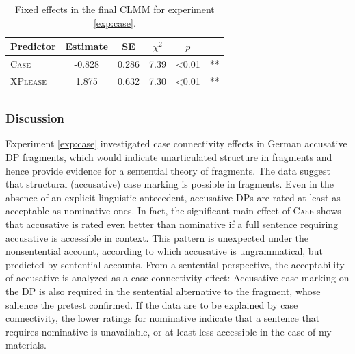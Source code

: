 \begin{table}
\begin{tabular}{lccccc}
\lsptoprule
Predictor & Estimate & SE & $\chi^2$ &  $p$ &  \\   
\midrule
\textsc{Case} & -0.828 &  0.286 &7.39 & \textless 0.01 & ** \\
\textsc{XPlease} &    \phantom{-}1.875 &     0.632 &   7.30 &  \textless 0.01 & **\\
\lspbottomrule
\end{tabular}
\caption{Fixed effects in the final CLMM for experiment \ref{exp:case}. \label{tab:case-estimates}}
\end{table}

\subsubsection{Discussion}\largerpage
Experiment \ref{exp:case} investigated case connectivity effects in German accusative DP fragments, which would indicate unarticulated structure in fragments and hence provide evidence for a sentential theory of fragments. The data suggest that structural (accusative) case marking is possible in fragments. Even in the absence of an explicit linguistic antecedent, accusative DPs are rated at least as acceptable as nominative ones. In fact, the significant main effect of \textsc{Case} shows that accusative is rated even better than nominative if a full sentence requiring accusative is accessible in context. This pattern is unexpected under the nonsentential account, according to which accusative is ungrammatical, but predicted by sentential accounts. From a sentential perspective, the acceptability of accusative is analyzed as a case connectivity effect: Accusative case marking on the DP is also required in the sentential alternative to the fragment, whose salience the pretest confirmed. If the data are to be explained by case connectivity, the lower ratings for nominative indicate that a sentence that requires nominative is unavailable, or at least less accessible in the case of my materials. 

